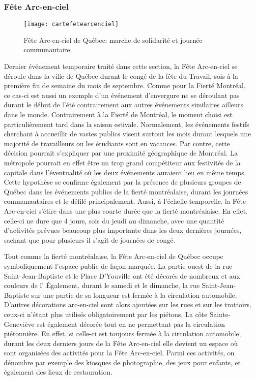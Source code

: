 \subsubsection{Fête Arc-en-ciel}
\label{subsec:fetearcenciel}

\begin{figure}[ht!]
 \centering
 \texttt{[image: cartefetearcenciel]}
 \caption[Fête Arc-en-ciel de Québec]{Fête Arc-en-ciel de Québec: marche de solidarité et journée communautaire}\label{fig:cartefetearcenciel}
\end{figure}

Dernier événement temporaire traité dans cette section, la Fête Arc-en-ciel se déroule dans la ville de Québec durant le congé de la fête du Travail, sois à la première fin de semaine du mois de septembre.
Comme pour la Fierté Montréal, ce cas-ci est aussi un exemple d'un événement d'envergure ne se déroulant pas durant le début de l'été contrairement aux autres événements similaires ailleurs dans le monde.
Contrairement à la Fierté de Montréal, le moment choisi est particulièrement tard dans la saison estivale.
Normalement, les événements festifs cherchant à accueillir de vastes publics visent surtout les mois durant lesquels une majorité de travailleurs ou les étudiants sont en vacances.
Par contre, cette décision pourrait s'expliquer par une proximité géographique de Montréal.
La métropole pourrait en effet être un trop grand compétiteur aux festivités de la capitale dans l'éventualité où les deux événements auraient lieu en même temps.
Cette hypothèse se confirme également par la présence de plusieurs groupes de Québec dans les événements publics de la fierté montréalaise, durant les journées communautaires et le défilé principalement.
Aussi, à l'échelle temporelle, la Fête Arc-en-ciel s'étire dans une plus courte durée que la fierté montréalaise.
En effet, celle-ci ne dure que 4 jours, sois du jeudi au dimanche, avec une quantité d'activités prévues beaucoup plus importante dans les deux dernières journées, sachant que pour plusieurs il s'agit de journées de congé.

Tout comme la fierté montréalaise, la Fête Arc-en-ciel de Québec occupe symboliquement l'espace public de façon marquée.
La partie ouest de la rue Saint-Jean-Baptiste et le Place D'Youville ont été décorés de nombreux   et  aux couleurs de l'
Également, durant le samedi et le dimanche, la rue Saint-Jean-Baptiste sur une partie de sa longueur est fermée à la circulation automobile.
D'autres décorations arc-en-ciel sont alors ajoutées sur les rues et sur les trottoirs, ceux-ci n'étant plus utilisés obligatoirement par les piétons.
La côte Sainte-Geneviève est également décorée tout en ne permettant pas la circulation piétonnière.
En effet, si celle-ci est toujours fermée à la circulation automobile, durant les deux derniers jours de la Fête Arc-en-ciel elle devient un espace où sont organisées des activités pour la Fête Arc-en-ciel. Parmi ces activités, on dénombre par exemple des kiosques de photographie, des jeux pour enfants, et également des lieux de restauration.

